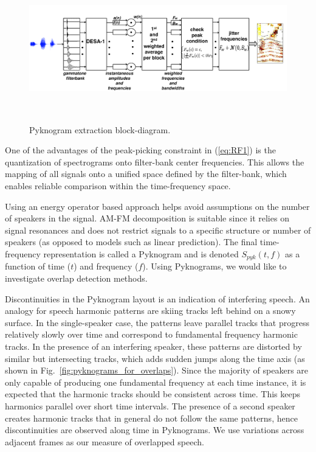 {\begin{figure}[t!]
	\centering
	\vspace{0mm}
	\includegraphics[height = 2.5in, width=1\textwidth]{figures/pyknogram_blockdiagram}
	\vspace{-3mm}
	\caption{Pyknogram extraction block-diagram.}
	\label{fig:pykno_blockdiag}
	\vspace{-3mm}
\end{figure}


One of the advantages of the peak-picking constraint in (\ref{eq:RF1}) is the quantization of spectrograms onto filter-bank center frequencies. 
This allows the mapping of all signals onto a unified space defined by the filter-bank, which enables reliable comparison within the time-frequency space. 

Using an energy operator based approach helps avoid assumptions on the number of speakers in the signal. 
AM-FM decomposition is suitable since it relies on signal resonances and does not restrict signals to a specific structure or number of speakers (as opposed to models such as linear prediction). 
The final time-frequency representation is called a Pyknogram and is denoted $S_{pyk}(t,f)$ as a function of time ($t$) and frequency ($f$). 
Using Pyknograms, we would like to investigate overlap detection methods.

Discontinuities in the Pyknogram layout is an indication of interfering speech. 
An analogy for speech harmonic patterns are skiing tracks left behind on a snowy surface. 
In the single-speaker case, the patterns leave parallel tracks that progress relatively slowly over time and correspond to fundamental frequency harmonic tracks. 
In the presence of an interfering speaker, these patterns are distorted by similar but intersecting tracks, which adds sudden jumps along the time axis (as shown in Fig.~\ref{fig:pyknograms_for_overlaps}). 
Since the majority of speakers are only capable of producing one fundamental frequency at each time instance, it is expected that the harmonic tracks should be consistent across time. 
This keeps harmonics parallel over short time intervals.   
The presence of a second speaker creates harmonic tracks that in general do not follow the same patterns, hence discontinuities are observed along time in Pyknograms. We use variations across adjacent frames as our measure of overlapped speech.

}
